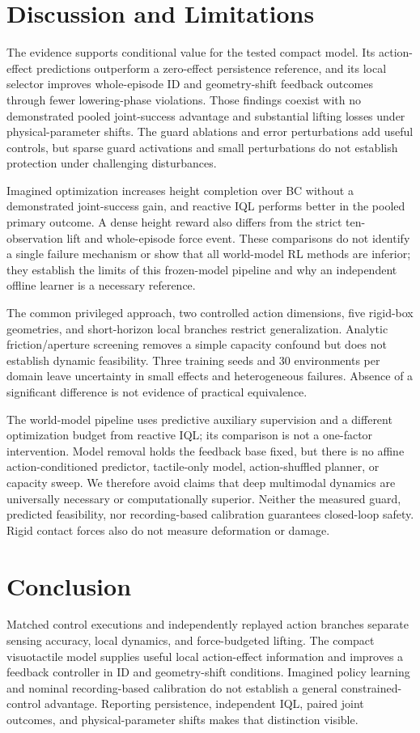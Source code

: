 \documentclass[letterpaper,10pt,conference]{ieeeconf}
\begin{document}
\section{Discussion and Limitations}
The evidence supports conditional value for the tested compact model. Its action-effect predictions outperform a zero-effect persistence reference, and its local selector improves whole-episode ID and geometry-shift feedback outcomes through fewer lowering-phase violations. Those findings coexist with no demonstrated pooled joint-success advantage and substantial lifting losses under physical-parameter shifts. The guard ablations and error perturbations add useful controls, but sparse guard activations and small perturbations do not establish protection under challenging disturbances.

Imagined optimization increases height completion over BC without a demonstrated joint-success gain, and reactive IQL performs better in the pooled primary outcome. A dense height reward also differs from the strict ten-observation lift and whole-episode force event. These comparisons do not identify a single failure mechanism or show that all world-model RL methods are inferior; they establish the limits of this frozen-model pipeline and why an independent offline learner is a necessary reference.


The common privileged approach, two controlled action dimensions,
five rigid-box geometries, and short-horizon local branches restrict
generalization. Analytic friction/aperture screening removes a simple
capacity confound but does not establish dynamic feasibility. Three
training seeds and 30 environments per domain leave uncertainty in
small effects and heterogeneous failures. Absence of a significant
difference is not evidence of practical equivalence.

The world-model pipeline uses predictive auxiliary supervision and a
different optimization budget from reactive IQL; its comparison is
not a one-factor intervention. Model removal holds the feedback base
fixed, but there is no affine action-conditioned predictor, tactile-only
model, action-shuffled planner, or capacity sweep. We therefore avoid
claims that deep multimodal dynamics are universally necessary or
computationally superior. Neither the measured guard, predicted
feasibility, nor recording-based calibration guarantees closed-loop
safety. Rigid contact forces also do not measure deformation or damage.

\section{Conclusion}
Matched control executions and independently replayed action branches separate sensing accuracy, local dynamics, and force-budgeted lifting. The compact visuotactile model supplies useful local action-effect information and improves a feedback controller in ID and geometry-shift conditions. Imagined policy learning and nominal recording-based calibration do not establish a general constrained-control advantage. Reporting persistence, independent IQL, paired joint outcomes, and physical-parameter shifts makes that distinction visible.
\end{document}
